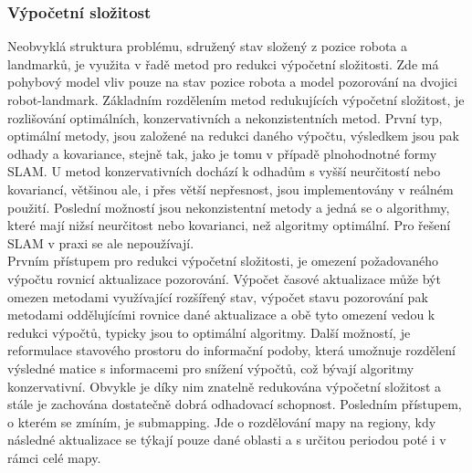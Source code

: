 \documentclass[12pt]{article}
\begin{document}
\subsubsection{Výpočetní složitost}
Neobvyklá struktura problému, sdružený stav složený z pozice robota a landmarků, je využita v řadě metod pro redukci výpočetní složitosti. Zde má pohybový model vliv pouze na stav pozice robota a model pozorování na dvojici robot-landmark. Základním rozdělením metod redukujících výpočetní složitost, je rozlišování optimálních, konzervativních a nekonzistentních metod. První typ, optimální metody, jsou založené na redukci daného výpočtu, výsledkem jsou pak odhady a kovariance, stejně tak, jako je tomu v případě plnohodnotné formy SLAM. U metod konzervativních dochází k odhadům s vyšší neurčitostí nebo kovariancí, většinou ale, i přes větší nepřesnost, jsou implementovány v reálném použití. Poslední možností jsou nekonzistentní metody a jedná se o algorithmy, které mají nižsí neurčitost nebo kovarianci, než algoritmy optimální. Pro řešení SLAM v praxi se ale nepoužívají.\\
\indent Prvním přístupem pro redukci výpočetní složitosti, je omezení požadovaného výpočtu rovnicí aktualizace pozorování. Výpočet časové aktualizace může být omezen metodami využívající rozšířený stav, výpočet stavu pozorování pak metodami oddělujícími rovnice dané aktualizace a obě tyto omezení vedou k redukci výpočtů, typicky jsou to optimální algoritmy. Další možností, je reformulace stavového prostoru do informační podoby, která umožnuje rozdělení výsledné matice s informacemi pro snížení výpočtů, což bývají algoritmy konzervativní. Obvykle je díky nim znatelně redukována výpočetní složitost a stále je zachována dostatečně dobrá odhadovací schopnost. Posledním přístupem, o kterém se zmíním, je submapping. Jde o rozdělování mapy na regiony, kdy následné aktualizace se týkají pouze dané oblasti a s určitou periodou poté i v rámci celé mapy. 
\end{document}
